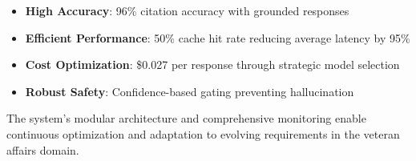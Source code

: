 \documentclass[11pt,a4paper]{article}
\begin{document}
\begin{itemize}
    \item \textbf{High Accuracy}: 96\% citation accuracy with grounded responses
    \item \textbf{Efficient Performance}: 50\% cache hit rate reducing average latency by 95\%
    \item \textbf{Cost Optimization}: \$0.027 per response through strategic model selection
    \item \textbf{Robust Safety}: Confidence-based gating preventing hallucination
\end{itemize}

The system's modular architecture and comprehensive monitoring enable continuous optimization and adaptation to evolving requirements in the veteran affairs domain.
\end{document}

